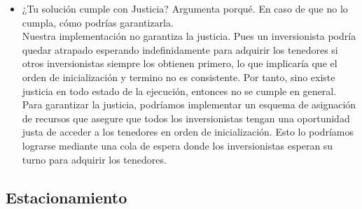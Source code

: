 \documentclass[10pt,letterpaper]{article}
\begin{document}
\begin{itemize}
        \item ¿Tu solución cumple con Justicia? Argumenta porqué. En caso de que no lo cumpla, cómo podrías garantizarla.\\
        Nuestra implementación no garantiza la justicia. Pues un inversionista podría quedar atrapado esperando indefinidamente para adquirir los tenedores si otros inversionistas siempre los obtienen primero, lo que implicaría que el orden de inicialización y termino no es consistente. Por tanto, sino existe justicia en todo estado de la ejecución, entonces no se cumple en general. Para garantizar la justicia, podríamos implementar un esquema de asignación de recursos que asegure que todos los inversionistas tengan una oportunidad justa de acceder a los tenedores en orden de inicialización. Esto lo podríamos lograrse mediante una cola de espera donde los inversionistas esperan su turno para adquirir los tenedores.
    \end{itemize}

    \subsection*{Estacionamiento}
\end{document}
